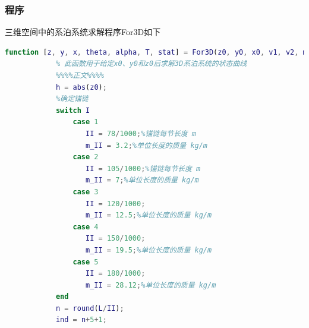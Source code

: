 \documentclass[UTF8]{ctexbook}
\theoremstyle{nonumberplain}
\begin{document}
        \subsubsection{程序}
            \par
            三维空间中的系泊系统求解程序For3D如下
            \begin{lstlisting}[language = Matlab]
            function [z, y, x, theta, alpha, T, stat] = For3D(z0, y0, x0, v1, v2, m_qiu, I, L, beta, xitong_figure)
            % 此函数用于给定x0、y0和z0后求解3D系泊系统的状态曲线
            %%%%正文%%%%
            h = abs(z0);
            %确定锚链
            switch I
                case 1
                   II = 78/1000;%锚链每节长度 m
                   m_II = 3.2;%单位长度的质量 kg/m
                case 2
                   II = 105/1000;%锚链每节长度 m
                   m_II = 7;%单位长度的质量 kg/m
                case 3
                   II = 120/1000;
                   m_II = 12.5;%单位长度的质量 kg/m
                case 4
                   II = 150/1000;
                   m_II = 19.5;%单位长度的质量 kg/m
                case 5
                   II = 180/1000;
                   m_II = 28.12;%单位长度的质量 kg/m
            end
            n = round(L/II);
            ind = n+5+1;


\end{lstlisting}
\end{document}
